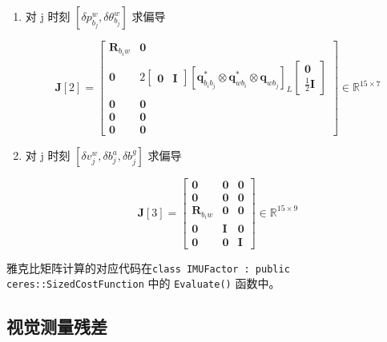 \documentclass[12pt,a4paper]{article}
\begin{document}
\begin{enumerate}
\begin{enumerate}
\item 对 {\color{blue}j 时刻 $[\delta p^{w}_{b_{j}},\delta \theta ^{w}_{b_{j}}]$} 求偏导

\begin{equation}
\mathbf{J}[2]=
\begin{bmatrix}
\mathbf{R}_{b_{i} w} & \mathbf{0} \\
\mathbf{0} & 2\left[\begin{array}{ll}{\mathbf{0}} & {\mathbf{I}}\end{array}\right]\left[\mathbf{q}_{b_{i} b_{j}}^{*} \otimes \mathbf{q}_{w b_{i}}^{*} \otimes \mathbf{q}_{w b_{j}}\right]_{L}\left[\begin{array}{c}{\mathbf{0}} \\ {\frac{1}{2} \mathbf{I}}\end{array}\right] \\
\mathbf{0} & \mathbf{0} \\
\mathbf{0} & \mathbf{0}  \\
\mathbf{0} & \mathbf{0}   
\end{bmatrix}
\in \mathbb{R}^{15 \times 7}
\end{equation}

\item 对 {\color{blue}j 时刻 $[\delta v^{w}_{j},\delta b^a_{j},\delta b^g_{j}]$} 求偏导

\begin{equation}
\mathbf{J}[3]=
\begin{bmatrix}
\mathbf{0} & \mathbf{0} & \mathbf{0} \\
\mathbf{0} & \mathbf{0} & \mathbf{0} \\
\mathbf{R}_{b_{i} w} & \mathbf{0} & \mathbf{0} \\
\mathbf{0} & \mathbf{I} & \mathbf{0} \\
\mathbf{0} & \mathbf{0} & \mathbf{I}
\end{bmatrix}
\in \mathbb{R}^{15 \times 9}
\end{equation}

\end{enumerate}

雅克比矩阵计算的对应代码在\verb|class IMUFactor : public ceres::SizedCostFunction| 中的 \verb|Evaluate()| 函数中。

\end{enumerate}

\subsection{视觉测量残差}
\end{document}

